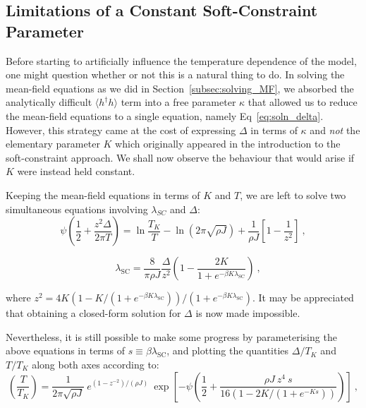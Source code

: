 

\subsection{Limitations of a Constant Soft-Constraint Parameter}

Before starting to artificially influence the temperature dependence of the model, one might question whether or not this is a natural thing to do. In solving the mean-field equations as we did in Section~\ref{subsec:solving_MF}, we absorbed the analytically difficult $ \langle h^{\dagger} h \rangle $ term into a free parameter $ \kappa $ that allowed us to reduce the mean-field equations to a single equation, namely Eq~\eqref{eq:soln_delta}. However, this strategy came at the cost of expressing $ \Delta $ in terms of $ \kappa $ and \emph{not} the elementary parameter $ K $ which originally appeared in the introduction to the soft-constraint approach. We shall now observe the behaviour that would arise if $ K $ were instead held constant.

Keeping the mean-field equations in terms of $ K $ and $ T $, we are left to solve two simultaneous equations involving $ \lambda_{SC} $ and $ \Delta $:
\begin{equation}
\psi \left( \frac{1}{2} + \frac{z^2 \Delta}{2 \pi T} \right) = \ln{\frac{T_K}{T}} - \ln{\left( 2 \pi \sqrt{\rho J} \right)} + \frac{1}{\rho J} \left[ 1 - \frac{1}{z^2} \right] ~ ,
\end{equation}

\begin{equation}
\quad \lambda_{\text{SC}} = \frac{8}{\pi \rho J} \frac{\Delta}{z^2} \left( 1 - \frac{2 K}{1 + e^{- \beta K \lambda_{\text{SC}}}} \right) ~ ,
\end{equation}

where $ z^2 = 4 K \left( 1 - K / (1 + e^{- \beta K \lambda_{\text{SC}}}) \right) / \left({1 + e^{- \beta K \lambda_{\text{SC}}}} \right) $. It may be appreciated that obtaining a closed-form solution for $ \Delta $ is now made impossible.

Nevertheless, it is still possible to make some progress by parameterising the above equations in terms of $ s \equiv \beta \lambda_{\text{SC}} $, and plotting the quantities $ \Delta / T_K $ and $ T / T_K $ along both axes according to:
\begin{equation}
\left( \frac{T}{T_K} \right) = \frac{1}{2 \pi \sqrt{\rho J}} ~ e^{(1 - z^{-2}) / (\rho J)} ~ \exp{\left[- \psi \left( \frac{1}{2} + \frac{\rho J ~ z^4 ~ s}{16 (1 - 2 K / (1 + e^{- K s}))} \right) \right]} ~ ,
\label{eq:parametric_T}
\end{equation}


